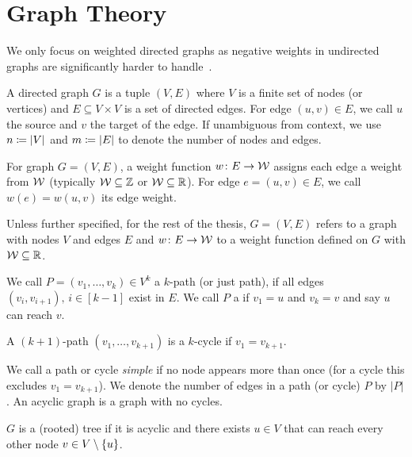 \section{Graph Theory}
We only focus on weighted directed graphs as negative weights in undirected graphs are significantly harder to handle~\cite{TJoin}. 

\begin{definition}
  A directed graph $G$ is a tuple $(V,E)$ where $V$ is a finite set of nodes (or vertices) and $E \subseteq V \times V$ is a set of directed edges.
  For edge $(u, v) \in E$, we call $u$ the source and $v$ the target of the edge.
  If unambiguous from context, we use $n \coloneqq |V|$ and $m \coloneqq |E|$ to denote the number of nodes and edges. 
\end{definition}

\begin{definition}
  For graph $G = (V, E)$, a weight function $w\colon E \rightarrow \mathcal W$ assigns each edge a weight from $\mathcal W$ (typically $\mathcal W \subseteq \mathbb Z$ or $\mathcal W \subseteq \mathbb R$).
  For edge $e = (u, v) \in E$, we call $w(e) = w(u, v)$ its edge weight.
\end{definition}

\noindent Unless further specified, for the rest of the thesis, $G = (V, E)$ refers to a graph with nodes $V$ and edges $E$ and $w\colon E \rightarrow \mathcal W$ to a weight function defined on $G$ with $\mathcal W \subseteq \mathbb R$.


\begin{definition}[Path]
  We call $P = (v_1, \ldots, v_k) \in V^k$ a $k$-path (or just path), if all edges $(v_i, v_{i + 1}),\,i \in [k - 1]$ exist in $E$.
  We call $P$ a  if $v_1 = u$ and $v_k = v$ and say $u$ can reach $v$.
\end{definition} 

\begin{definition}[Cycle]
  A $(k + 1)$-path $(v_1, \ldots, v_{k + 1})$ is a $k$-cycle if $v_1 = v_{k + 1}$.  
\end{definition}

\noindent We call a path or cycle \emph{simple} if no node appears more than once (for a cycle this excludes $v_1 = v_{k + 1}$).
We denote the number of edges in a path (or cycle) $P$ by $|P|$.
An acyclic graph is a graph with no cycles.

\begin{definition}[Tree]
  $G$ is a (rooted) tree if it is acyclic and there exists $u \in V$ that can reach every other node $v \in V \setminus \left\{u\right\}$. 
\end{definition}


